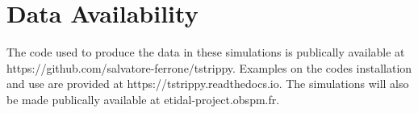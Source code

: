 \documentclass[draft]{aa}
\begin{document}
\section*{Data Availability}

  The code used to produce the data in these simulations is publically available at https://github.com/salvatore-ferrone/tstrippy. Examples on the codes installation and use are provided at https://tstrippy.readthedocs.io. The simulations will also be made publically available at etidal-project.obspm.fr.







\end{document}
